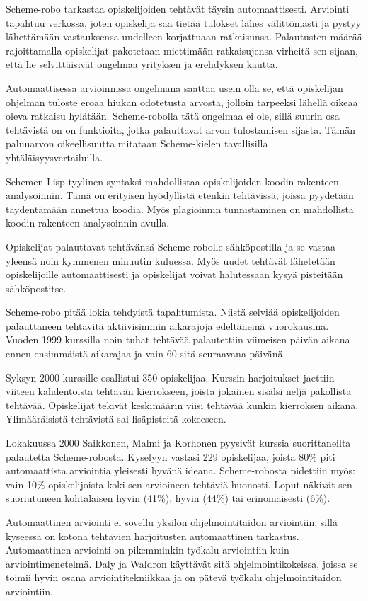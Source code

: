 \documentclass[finnish]{../tktltiki2}
\theoremstyle{definition}
\theoremstyle{remark}
\begin{document}
Scheme-robo tarkastaa opiskelijoiden tehtävät täysin automaattisesti. Arviointi tapahtuu verkossa, joten opiskelija saa tietää tulokset lähes välittömästi ja pystyy lähettämään vastauksensa uudelleen korjattuaan ratkaisunsa. Palautusten määrää rajoittamalla opiskelijat pakotetaan miettimään ratkaisujensa virheitä sen sijaan, että he selvittäisivät ongelmaa yrityksen ja erehdyksen kautta.

Automaattisessa arvioinnissa ongelmana saattaa usein olla se, että opiskelijan ohjelman tuloste eroaa hiukan odotetusta arvosta, jolloin tarpeeksi lähellä oikeaa oleva ratkaisu hylätään. Scheme-robolla tätä ongelmaa ei ole, sillä suurin osa tehtävistä on on funktioita, jotka palauttavat arvon tulostamisen sijasta. Tämän paluuarvon oikeellisuutta mitataan Scheme-kielen tavallisilla yhtäläisyysvertailuilla.

Schemen Lisp-tyylinen syntaksi mahdollistaa opiskelijoiden koodin rakenteen analysoinnin. Tämä on erityisen hyödyllistä etenkin tehtävissä, joissa pyydetään täydentämään annettua koodia. Myös plagioinnin tunnistaminen on mahdollista koodin rakenteen analysoinnin avulla.

Opiskelijat palauttavat tehtävänsä Scheme-robolle sähköpostilla ja se vastaa yleensä noin kymmenen minuutin kuluessa. Myös uudet tehtävät lähetetään opiskelijoille automaattisesti ja opiskelijat voivat halutessaan kysyä pisteitään sähköpostitse.

Scheme-robo pitää lokia tehdyistä tapahtumista. Niistä selviää opiskelijoiden palauttaneen tehtävitä aktiivisimmin aikarajoja edeltäneinä vuorokausina. Vuoden 1999 kurssilla noin tuhat tehtävää palautettiin viimeisen päivän aikana ennen ensimmäistä aikarajaa ja vain 60 sitä seuraavana päivänä.

Syksyn 2000 kurssille osallistui 350 opiskelijaa. Kurssin harjoitukset jaettiin viiteen kahdentoista tehtävän kierrokseen, joista jokainen sisälsi neljä pakollista tehtävää. Opiskelijat tekivät keskimäärin viisi tehtävää kunkin kierroksen aikana. Ylimääräisistä tehtävistä sai lisäpisteitä kokeeseen.

Lokakuussa 2000 Saikkonen, Malmi ja Korhonen pyysivät kurssia suorittaneilta palautetta Scheme-robosta. Kyselyyn vastasi 229 opiskelijaa, joista 80\% piti automaattista arviointia yleisesti hyvänä ideana. Scheme-robosta pidettiin myös: vain 10\% opiskelijoista koki sen arvioineen tehtäviä huonosti. Loput näkivät sen suoriutuneen kohtalaisen hyvin (41\%), hyvin (44\%) tai erinomaisesti (6\%).

Automaattinen arviointi ei sovellu yksilön ohjelmointitaidon arviointiin, sillä kyseessä on kotona tehtävien harjoitusten automaattinen tarkastus. Automaattinen arviointi on pikemminkin työkalu arviointiin kuin arviointimenetelmä. Daly ja Waldron käyttävät sitä ohjelmointikokeissa, joissa se toimii hyvin osana arviointitekniikkaa ja on pätevä työkalu ohjelmointitaidon arviointiin.
\end{document}
